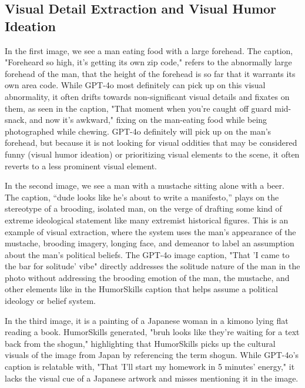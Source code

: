 \subsection{Visual Detail Extraction and Visual Humor Ideation}

In the first image, we see a man eating food with a large forehead. The caption, "Foreheard so high, it's getting its own zip code," refers to the abnormally large forehead of the man, that the height of the forehead is so far that it warrants its own area code. While GPT-4o most definitely can pick up on this visual abnormality, it often drifts towards non-significant visual details and fixates on them, as seen in the caption, "That moment when you're caught off guard mid-snack, and now it's awkward," fixing on the man-eating food while being photographed while chewing. GPT-4o definitely will pick up on the man's forehead, but because it is not looking for visual oddities that may be considered funny (visual humor ideation) or prioritizing visual elements to the scene, it often reverts to a less prominent visual element. 

In the second image, we see a man with a mustache sitting alone with a beer. The caption, “dude looks like he’s about to write a manifesto,” plays on the stereotype of a brooding, isolated man, on the verge of drafting some kind of extreme ideological statement like many extremist historical figures. This is an example of visual extraction, where the system uses the man’s appearance of the mustache, brooding imagery, longing face, and demeanor to label an assumption about the man's political beliefs. The GPT-4o image caption, "That 'I came to the bar for solitude' vibe" directly addresses the solitude nature of the man in the photo without addressing the brooding emotion of the man, the mustache, and other elements like in the HumorSkills caption that helps assume a political ideology or belief system.

In the third image, it is a painting of a Japanese woman in a kimono lying flat reading a book. HumorSkills generated, "bruh looks like they're waiting for a text back from the shogun," highlighting that HumorSkills picks up the cultural visuals of the image from Japan by referencing the term shogun. While GPT-4o's caption is relatable with, "That 'I'll start my homework in 5 minutes' energy," it lacks the visual cue of a Japanese artwork and misses mentioning it in the image.

